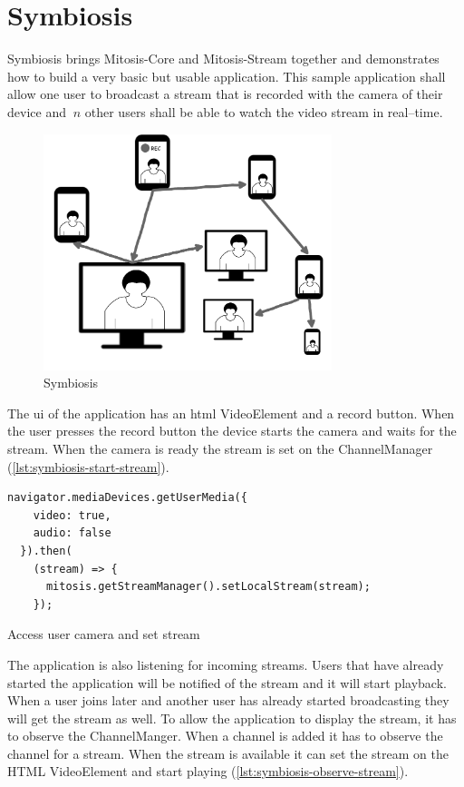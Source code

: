 \section{Symbiosis}\label{sec:symbiosis}
Symbiosis brings Mitosis-Core and Mitosis-Stream together and demonstrates how to build a very basic but usable application.
This sample application shall allow one user to broadcast a stream that is recorded with the camera of their device and $\ n $ other users shall be able to watch the video stream in real–time.

\begin{figure}
\centering
\includegraphics[width=0.75\textwidth]{graphics/implementation/symbiosis.pdf}
\caption{Symbiosis}
\label{fig:symbiosis-implementation}
\end{figure}

The \gls{ui} of the application has an \gls{html} VideoElement and a record button. When the user presses the record button the device starts the camera and waits for the stream. When the camera is ready the stream is set on the ChannelManager (\vref{lst:symbiosis-start-stream}).

\begin{Listing}
\begin{lstlisting}
navigator.mediaDevices.getUserMedia({
    video: true,
    audio: false
  }).then(
    (stream) => {
      mitosis.getStreamManager().setLocalStream(stream);
    });
\end{lstlisting}
\caption{Access user camera and set stream}
\label{lst:symbiosis-start-stream}
\end{Listing}

The application is also listening for incoming streams. Users that have already started the application will be notified of the stream and it will start playback. When a user joins later and another user has already started broadcasting they will get the stream as well.
To allow the application to display the stream, it has to observe the ChannelManger. When a channel is added it has to observe the channel for a stream. When the stream is available it can set the stream on the HTML VideoElement and start playing (\vref{lst:symbiosis-observe-stream}).

